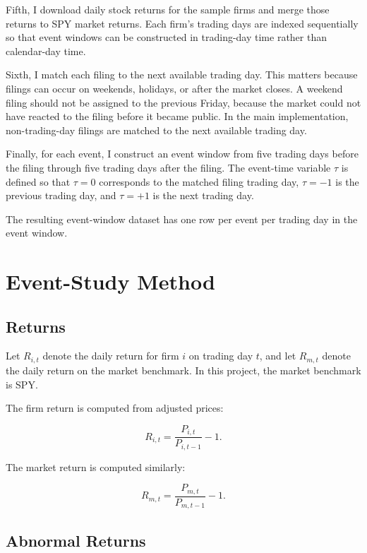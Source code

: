 \documentclass[12pt]{article}
\begin{document}
	Fifth, I download daily stock returns for the sample firms and merge those returns to SPY market returns. Each firm's trading days are indexed sequentially so that event windows can be constructed in trading-day time rather than calendar-day time.
	
	Sixth, I match each filing to the next available trading day. This matters because filings can occur on weekends, holidays, or after the market closes. A weekend filing should not be assigned to the previous Friday, because the market could not have reacted to the filing before it became public. In the main implementation, non-trading-day filings are matched to the next available trading day.
	
	Finally, for each event, I construct an event window from five trading days before the filing through five trading days after the filing. The event-time variable $\tau$ is defined so that $\tau = 0$ corresponds to the matched filing trading day, $\tau = -1$ is the previous trading day, and $\tau = +1$ is the next trading day.
	
	The resulting event-window dataset has one row per event per trading day in the event window.
	
	\section{Event-Study Method}
	
	\subsection{Returns}
	
	Let $R_{i,t}$ denote the daily return for firm $i$ on trading day $t$, and let $R_{m,t}$ denote the daily return on the market benchmark. In this project, the market benchmark is SPY.
	
	The firm return is computed from adjusted prices:
	
	\begin{equation}
		R_{i,t} = \frac{P_{i,t}}{P_{i,t-1}} - 1.
	\end{equation}
	
	The market return is computed similarly:
	
	\begin{equation}
		R_{m,t} = \frac{P_{m,t}}{P_{m,t-1}} - 1.
	\end{equation}
	
	\subsection{Abnormal Returns}
	
\end{document}
